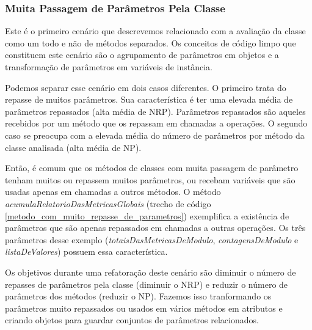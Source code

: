           
              

\subsubsection{Muita Passagem de Parâmetros Pela Classe}
	
Este é o primeiro cenário que descrevemos relacionado com a avaliação da classe como um todo e não de métodos separados. Os conceitos de código limpo que constituem este cenário são o agrupamento de parâmetros em objetos e a transformação de parâmetros em variáveis de instância.
	
Podemos separar esse cenário em dois casos diferentes. O primeiro trata do repasse de muitos parâmetros. Sua característica é ter uma elevada média de parâmetros repassados (alta média de NRP). Parâmetros repassados são aqueles recebidos por um método que os repassam em chamadas a operações. O segundo caso se preocupa com a elevada média do número de parâmetros por método da classe analisada (alta média de NP).       
		     
Então, é comum que os métodos de classes com muita passagem de parâmetro tenham muitos ou repassem muitos parâmetros, ou recebam variáveis que são usadas apenas em chamadas a outros métodos.	O método \textit{acumulaRelatorioDasMetricasGlobais} (trecho de código \ref{metodo_com_muito_repasse_de_parametros}) exemplifica a existência de parâmetros que são apenas repassados em chamadas a outras operações. Os três parâmetros desse exemplo (\textit{totaisDasMetricasDeModulo}, \textit{contagensDeModulo} e \textit{listaDeValores}) possuem essa característica. 
	                                                               
                                     
	
Os objetivos durante uma refatoração deste cenário são diminuir o número de repasses de parâmetros pela classe (diminuir o NRP) e reduzir o número de parâmetros dos métodos (reduzir o NP). Fazemos isso tranformando os parâmetros muito repassados ou usados em vários métodos em atributos e criando objetos para guardar conjuntos de parâmetros relacionados.
	
